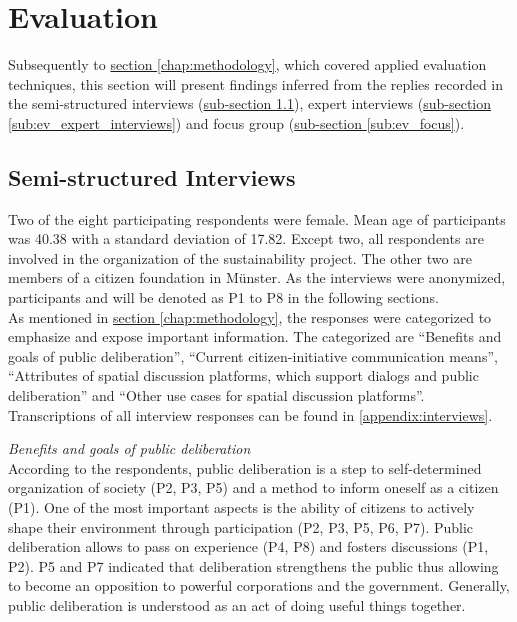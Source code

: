 \section{Evaluation}
\label{chap:evaluation}
Subsequently to \hyperref[chap:methodology]{section \ref{chap:methodology}}, which covered applied evaluation techniques, this section will present findings inferred from the replies recorded in the semi-structured interviews (\hyperref[sub:ev_interviews]{sub-section \ref{sub:ev_interviews}}), expert interviews (\hyperref[sub:ev_expert_interviews]{sub-section \ref{sub:ev_expert_interviews}}) and focus group (\hyperref[sub:ev_focus]{sub-section \ref{sub:ev_focus}}).

\subsection{Semi-structured Interviews}
\label{sub:ev_interviews}
Two of the eight participating respondents were female. Mean age of participants was 40.38 with a standard deviation of 17.82. Except two, all respondents are involved in the organization of the sustainability project. The other two are members of a citizen foundation in M{\"u}nster. As the interviews were anonymized, participants and will be denoted as P1 to P8 in the following sections.\\
As mentioned in \hyperref[chap:methodology]{section \ref{chap:methodology}}, the responses were categorized to emphasize and expose important information. The categorized are ``Benefits and goals of public deliberation'', ``Current citizen-initiative communication means'', ``Attributes of spatial discussion platforms, which support dialogs and public deliberation'' and ``Other use cases for spatial discussion platforms''.\\
Transcriptions of all interview responses can be found in \ref{appendix:interviews}.

\textit{Benefits and goals of public deliberation}\\
According to the respondents, public deliberation is a step to self-determined organization of society (P2, P3, P5) and a method to inform oneself as a citizen (P1). One of the most important aspects is the ability of citizens to actively shape their environment through participation (P2, P3, P5, P6, P7). Public deliberation allows to pass on experience (P4, P8) and fosters discussions (P1, P2). P5 and P7 indicated that deliberation strengthens the public thus allowing to become an opposition to powerful corporations and the government. Generally, public deliberation is understood as an act of doing useful things together.

